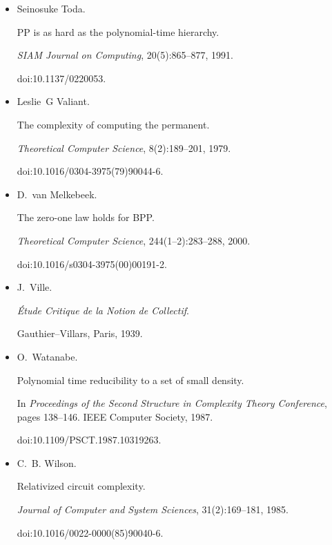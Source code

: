\documentclass[10pt,a4paper]{article}
\begin{document}
\begin{itemize}
doi:10.1017/9781108781718.010.





\item[] 
[75]

Seinosuke Toda.


PP is as hard as the polynomial-time hierarchy.


\emph{SIAM Journal on Computing}, 20(5):865–877, 1991.


doi:10.1137/0220053.





\item[] 
[76]

Leslie G Valiant.


The complexity of computing the permanent.


\emph{Theoretical Computer Science}, 8(2):189–201, 1979.


doi:10.1016/0304-3975(79)90044-6.





\item[] 
[77]

D. van Melkebeek.


The zero-one law holds for BPP.


\emph{Theoretical Computer Science}, 244(1–2):283–288, 2000.


doi:10.1016/s0304-3975(00)00191-2.





\item[] 
[78]

J. Ville.


\emph{Étude Critique de la Notion de Collectif}.


Gauthier–Villars, Paris, 1939.





\item[] 
[79]

O. Watanabe.


Polynomial time reducibility to a set of small density.


In \emph{Proceedings of the Second Structure in Complexity Theory
Conference}, pages 138–146. IEEE Computer Society, 1987.


doi:10.1109/PSCT.1987.10319263.





\item[] 
[80]

C. B. Wilson.


Relativized circuit complexity.


\emph{Journal of Computer and System Sciences}, 31(2):169–181, 1985.


doi:10.1016/0022-0000(85)90040-6.





\end{itemize}
\end{document}
